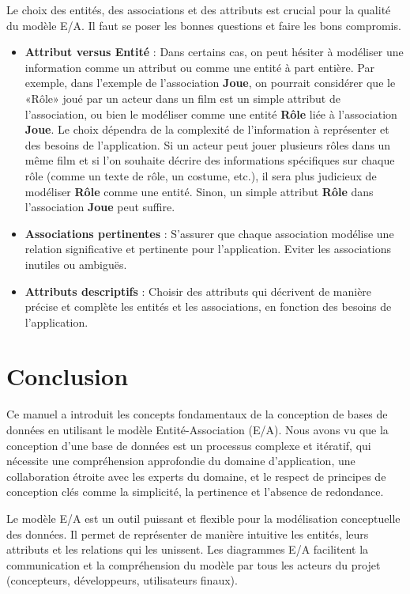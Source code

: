 \documentclass{article}
\begin{document}
Le choix des entités, des associations et des attributs est crucial pour la qualité du modèle E/A.  Il faut se poser les bonnes questions et faire les bons compromis.

\begin{itemize}
    \item \textbf{Attribut versus Entité} :  Dans certains cas, on peut hésiter à modéliser une information comme un attribut ou comme une entité à part entière.  Par exemple, dans l'exemple de l'association \textbf{Joue}, on pourrait considérer que le «Rôle» joué par un acteur dans un film est un simple attribut de l'association, ou bien le modéliser comme une entité \textbf{Rôle} liée à l'association \textbf{Joue}. Le choix dépendra de la complexité de l'information à représenter et des besoins de l'application. Si un acteur peut jouer plusieurs rôles dans un même film et si l'on souhaite décrire des informations spécifiques sur chaque rôle (comme un texte de rôle, un costume, etc.), il sera plus judicieux de modéliser \textbf{Rôle} comme une entité.  Sinon, un simple attribut \textbf{Rôle} dans l'association \textbf{Joue} peut suffire.
    \item \textbf{Associations pertinentes} :  S'assurer que chaque association modélise une relation significative et pertinente pour l'application.  Eviter les associations inutiles ou ambiguës.
    \item \textbf{Attributs descriptifs} :  Choisir des attributs qui décrivent de manière précise et complète les entités et les associations, en fonction des besoins de l'application.
\end{itemize}


\section{Conclusion}

Ce manuel a introduit les concepts fondamentaux de la conception de bases de données en utilisant le modèle Entité-Association (E/A).  Nous avons vu que la conception d'une base de données est un processus complexe et itératif, qui nécessite une compréhension approfondie du domaine d'application, une collaboration étroite avec les experts du domaine, et le respect de principes de conception clés comme la simplicité, la pertinence et l'absence de redondance.

Le modèle E/A est un outil puissant et flexible pour la modélisation conceptuelle des données.  Il permet de représenter de manière intuitive les entités, leurs attributs et les relations qui les unissent.  Les diagrammes E/A facilitent la communication et la compréhension du modèle par tous les acteurs du projet (concepteurs, développeurs, utilisateurs finaux).
\end{document}
